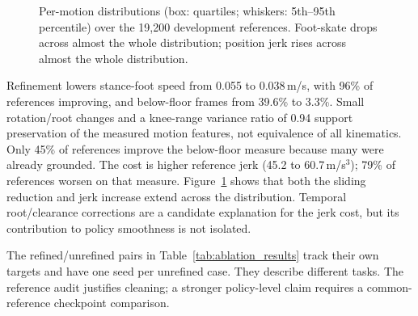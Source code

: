 \documentclass[11pt]{article}
\begin{document}
\begin{figure}[t]
\centering
{}
\caption{Per-motion distributions (box: quartiles; whiskers: 5th--95th
percentile) over the 19,200 development references. Foot-skate drops across
almost the whole distribution; position jerk rises across almost the whole
distribution.}\label{fig:refine_dist}
\end{figure}

Refinement lowers stance-foot speed from 0.055 to 0.038\,m/s, with 96\%
of references improving, and below-floor frames from 39.6\% to 3.3\%.
Small rotation/root changes and a knee-range variance ratio of 0.94 support
preservation of the measured motion features, not equivalence of all
kinematics. Only 45\% of references improve the below-floor measure because
many were already grounded. The cost is higher reference jerk (45.2 to
60.7\,m/s$^3$); 79\% of references worsen on that measure.
Figure~\ref{fig:refine_dist} shows that both the sliding reduction and jerk
increase extend across the distribution. Temporal root/clearance corrections
are a candidate explanation for the jerk cost, but its contribution to
policy smoothness is not isolated.

The refined/unrefined pairs in Table~\ref{tab:ablation_results} track their
own targets and have one seed per unrefined case. They describe different
tasks. The reference audit justifies cleaning; a stronger policy-level claim
requires a common-reference checkpoint comparison.
\end{document}
